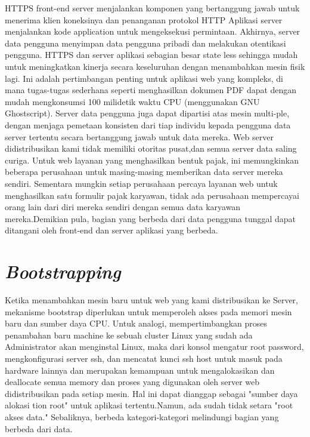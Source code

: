 \documentclass{jtetiproposalskripsi}
\begin{document}
HTTPS front-end server menjalankan komponen yang bertanggung jawab untuk menerima klien koneksinya dan penanganan protokol HTTP Aplikasi server menjalankan kode application untuk mengeksekusi permintaan. Akhirnya, server data pengguna menyimpan data pengguna pribadi dan melakukan otentikasi pengguna. HTTPS dan server aplikasi sebagian besar state less sehingga mudah untuk meningkatkan kinerja secara keseluruhan dengan menambahkan mesin fisik lagi. Ini adalah pertimbangan penting untuk aplikasi web yang kompleks, di mana tugas-tugas sederhana seperti menghasilkan dokumen PDF dapat dengan mudah mengkonsumsi 100 milidetik waktu CPU (menggunakan GNU Ghostscript). Server data pengguna juga dapat dipartisi atas mesin multi-ple, dengan menjaga pemetaan konsisten dari tiap individu kepada pengguna data server tertentu secara bertanggung jawab untuk data mereka. Web server didistribusikan kami tidak memiliki otoritas pusat,dan semua server data saling curiga. Untuk web layanan yang menghasilkan bentuk pajak, ini memungkinkan beberapa perusahaan untuk masing-masing memberikan data server mereka sendiri. Sementara mungkin setiap perusahaan percaya layanan web untuk menghasilkan satu formulir pajak karyawan, tidak ada perusahaan mempercayai orang lain dari diri mereka sendiri dengan semua data karyawan mereka.Demikian pula, bagian yang berbeda dari data pengguna tunggal dapat ditangani oleh front-end dan server aplikasi yang berbeda.

\section{ \emph{Bootstrapping}}
Ketika menambahkan mesin baru untuk web yang kami distribusikan ke Server, mekanisme bootstrap diperlukan untuk memperoleh akses pada memori mesin baru dan sumber daya CPU. Untuk analogi, mempertimbangkan proses penambahan baru machine ke sebuah cluster Linux yang sudah ada Administrator
akan menginstal Linux, maka dari konsol mengatur root
password, mengkonfigurasi server ssh, dan  mencatat kunci ssh host untuk masuk pada hardware lainnya dan merupakan kemampuan untuk mengalokasikan dan deallocate semua memory dan proses yang digunakan oleh server web didistribusikan pada setiap mesin. Hal ini dapat dianggap sebagai "sumber daya alokasi tion root" untuk aplikasi tertentu.Namun, ada sudah tidak setara "root akses data." Sebaliknya, berbeda kategori-kategori melindungi bagian yang berbeda dari data.




\end{document}
